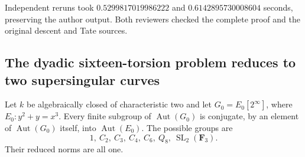 Independent reruns took $0.5299817019986222$ and
$0.6142895730008604$ seconds, preserving the author output. Both reviewers
checked the complete proof and the original descent and Tate sources.


\subsection{The dyadic sixteen-torsion problem reduces to two supersingular curves}

\begin{lemma}
\label{lem:B-RD44-conjugacy}
Let $k$ be algebraically closed of characteristic two and let
$G_0=E_0[2^\infty]$, where $E_0:y^2+y=x^3$.
Every finite subgroup of $\operatorname{Aut}(G_0)$ is conjugate,
by an element of $\operatorname{Aut}(G_0)$ itself, into
$\operatorname{Aut}(E_0)$. The possible groups are
\[
 1,\ C_2,\ C_3,\ C_4,\ C_6,\ Q_8,\ \operatorname{SL}_2(\mathbf F_3).
 \tag{B-RD44.1}
\]
Their reduced norms are all one.
\end{lemma}
